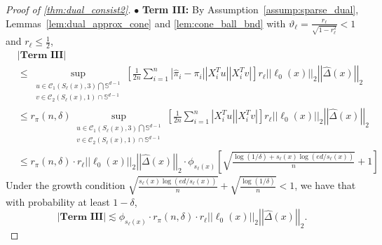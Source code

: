 \documentclass[10pt,a4paper]{amsart}
\theoremstyle{plain}
\theoremstyle{remark}
\renewcommand{\hat}{\widehat}
\newcommand{\norm}[1]{\left|\left| #1 \right|\right|}
\begin{document}
\begin{proof}[Proof of \autoref{thm:dual_consist2}]
	$\bullet$ {\bf Term III:} By Assumption~\ref{assump:sparse_dual}, Lemmas~\ref{lem:dual_approx_cone} and \ref{lem:cone_ball_bnd} with $\vartheta_{\ell}=\frac{r_{\ell}}{\sqrt{1-r_{\ell}^2}} < 1$ and $r_{\ell} \leq \frac{1}{2}$, 
	\begin{align*}
		&\left|\textbf{Term III}\right| \\
		&\leq \sup_{\substack{u \in \mathcal{C}_1(S_{\ell}(x),3) \bigcap \mathbb{S}^{d-1}\\v\in \mathcal{C}_2(S_{\ell}(x), 1) \cap \mathbb{S}^{d-1}}} \left[\frac{1}{2n} \sum_{i=1}^n \left|\hat{\pi}_i - \pi_i\right| \left|X_i^Tu \right| |X_i^Tv| \right] r_{\ell} \norm{\ell_0(x)}_2 \norm{\hat{\Delta}(x)}_2\\
		&\leq r_{\pi}(n,\delta) \sup_{\substack{u \in \mathcal{C}_1(S_{\ell}(x),3) \bigcap \mathbb{S}^{d-1}\\v\in \mathcal{C}_2(S_{\ell}(x), 1) \cap \mathbb{S}^{d-1}}} \left[\frac{1}{2n} \sum_{i=1}^n \left|X_i^Tu \right| |X_i^Tv| \right] r_{\ell} \norm{\ell_0(x)}_2 \norm{\hat{\Delta}(x)}_2\\
		&\leq r_{\pi}(n,\delta) \cdot r_{\ell} \norm{\ell_0(x)}_2 \norm{\hat{\Delta}(x)}_2 \cdot \phi_{s_{\ell}(x)} \left[\sqrt{\frac{\log(1/\delta) + s_{\ell}(x)\log(ed/s_{\ell}(x))}{n}} + 1 \right]
	\end{align*}
	Under the growth condition $\sqrt{\frac{s_{\ell}(x)\log(ed/s_{\ell}(x))}{n}} + \sqrt{\frac{\log(1/\delta)}{n}} < 1$, we have that with probability at least $1-\delta$, 
	$$\left|\textbf{Term III}\right| \lesssim \phi_{s_{\ell}(x)} \cdot r_{\pi}(n,\delta) \cdot r_{\ell} \norm{\ell_0(x)}_2 \norm{\hat{\Delta}(x)}_2.$$
	

\end{proof}
\end{document}
